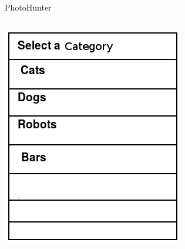 \documentclass[aspectratio=169]{beamer}
\begin{document}
\begin{frame}{PhotoHunter}
  \begin{columns}[c]
    \begin{column}{0.5\columnwidth}
      \centering
      \includegraphics[width=\textwidth,height=\textheight,keepaspectratio]{ss_photohunter_dataset}
    \end{column}
    \begin{column}{0.5\columnwidth}
      \centering

\end{column}
\end{columns}
\end{frame}
\end{document}
